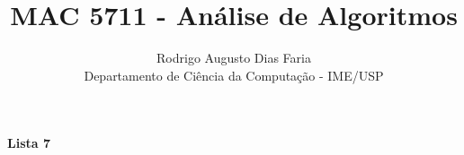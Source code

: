 \documentclass[12pt]{article}
\begin{document}
\title{MAC 5711 - Análise de Algoritmos}
\author{Rodrigo Augusto Dias Faria\\
Departamento de Ciência da Computação - IME/USP}

\maketitle

\begin{comment}
\begin{center}
\textbf{\large{Lista 1}}
\end{center}




\clearpage
\begin{center}
\textbf{\large{Lista 2}}
\end{center}



\clearpage
\begin{center}
\textbf{\large{Lista 3}}
\end{center}





\clearpage

\begin{center}
\textbf{\large{Lista 4}}
\end{center}






\clearpage

\begin{center}
\textbf{\large{Lista 5}}
\end{center}


















\clearpage

\begin{center}
\textbf{\large{Lista 6}}
\end{center}

















\clearpage
\end{comment}

\begin{center}
\textbf{\large{Lista 7}}
\end{center}

















\clearpage
\end{document}
